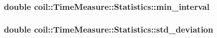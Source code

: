 \subsubsection[{min\_\-interval}]{\setlength{\rightskip}{0pt plus 5cm}double {\bf coil::TimeMeasure::Statistics::min\_\-interval}}\label{structcoil_1_1TimeMeasure_1_1Statistics_af16157a877f9ac5aeffbafefafdbdfb5}
\subsubsection[{std\_\-deviation}]{\setlength{\rightskip}{0pt plus 5cm}double {\bf coil::TimeMeasure::Statistics::std\_\-deviation}}\label{structcoil_1_1TimeMeasure_1_1Statistics_a959b2cae588528954dbeb694908676f3}
